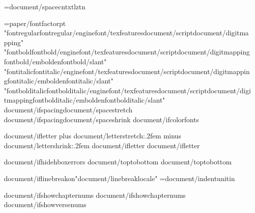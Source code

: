 \XeTeXinterwordspaceshaping={document/spacecntxtlztn}

={paper/fontfactor}pt
\def\regular{L_}{{"{fontregular}{fontregular/engine}{font/texfeatures}{document/script}{document/digitmapping}"}}
\def\bold{L_}{{"{fontbold}{fontbold/engine}{font/texfeatures}{document/script}{document/digitmapping}{fontbold/embolden}{fontbold/slant}"}}
\def\italic{L_}{{"{fontitalic}{fontitalic/engine}{font/texfeatures}{document/script}{document/digitmapping}{fontitalic/embolden}{fontitalic/slant}"}}
\def\bolditalic{L_}{{"{fontbolditalic}{fontbolditalic/engine}{font/texfeatures}{document/script}{document/digitmapping}{fontbolditalic/embolden}{fontbolditalic/slant}"}}
{document/ifspacing}\def\SpaceStretchFactor{L_}{{{document/spacestretch}}}
{document/ifspacing}\def\SpaceShrinkFactor{L_}{{{document/spaceshrink}}}
{document/ifcolorfonts}\ColorFontsfalse


{document/ifletter}\newskip\intercharskip \intercharskip=0pt plus {document/letterstretch:.2f}em minus {document/lettershrink:.2f}em
{document/ifletter}\def\letterspace{{\nobreak\hskip\intercharskip}}
{document/ifletter}\DefineActiveChar{{^^^^fdd0}}{{\letterspace}}


{document/ifhidehboxerrors}\overfullrule=0pt
{document/toptobottom}     %
{document/toptobottom}\rotatetrue

{document/iflinebreakon}\XeTeXlinebreaklocale "{document/linebreaklocale}"
\IndentUnit={document/indentunit}in

{document/ifshowchapternums}\OmitChapterNumbertrue
{document/ifshowchapternums}\def\AfterChapterSpaceFactor{{10}}
{document/ifshowversenums}\def\AfterVerseSpaceFactor{{0}}

